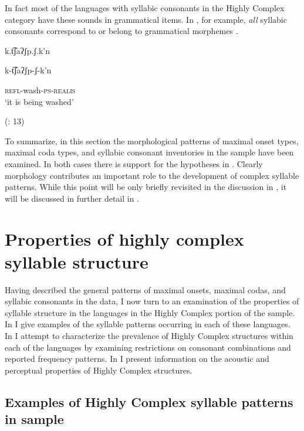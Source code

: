   In fact most of the languages with syllabic consonants in the Highly Complex category have these sounds in grammatical items. In , for example, \textit{all} syllabic consonants correspond to or belong to grammatical morphemes .

\ea\label{ex:3.26}

k.t͡ʃaʔʃp.ʃ.k’n

k-t͡ʃaʔʃp-ʃ-k’n

\textsc{refl}-wash-\textsc{ps-realis}\\
\glt ‘it is being washed’

(\citealt{FernándezGarayHernández2006}: 13)
\z

  To summarize, in this section the morphological patterns of maximal onset types, maximal coda types, and syllabic consonant inventories in the sample have been examined. In both cases there is support for the hypotheses in . Clearly morphology contributes an important role to the development of complex syllable patterns. While this point will be only briefly revisited in the discussion in , it will be discussed in further detail in .

\section{Properties of highly complex syllable structure}\label{sec:3.4}

  Having described the general patterns of maximal onsets, maximal codas, and syllabic consonants in the data, I now turn to an examination of the properties of syllable structure in the languages in the Highly Complex portion of the sample. In  I give examples of the syllable patterns occurring in each of these languages. In  I attempt to characterize the prevalence of Highly Complex structures within each of the languages by examining restrictions on consonant combinations and reported frequency patterns. In  I present information on the acoustic and perceptual properties of Highly Complex structures.

\subsection{Examples of Highly Complex syllable patterns in sample}\label{sec:3.4.1}

